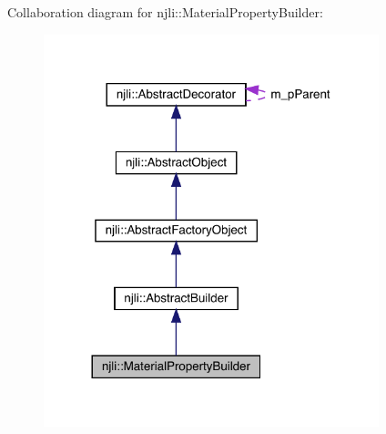Collaboration diagram for njli\+:\+:Material\+Property\+Builder\+:\nopagebreak
\begin{figure}[H]
\begin{center}
\leavevmode
\includegraphics[width=276pt]{classnjli_1_1_material_property_builder__coll__graph}
\end{center}
\end{figure}
